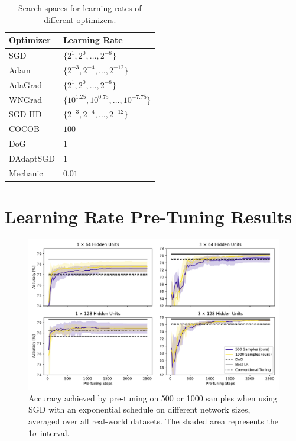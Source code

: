 \documentclass[letterpaper]{article} %
\begin{document}
\begin{table}[H]
	\centering
	\begin{tabular}{ll}
		\toprule
		Optimizer & Learning Rate                                  \\
		\midrule
		SGD       & $\{2^{1}, 2^{0}, \ldots, 2^{-8}\}$             \\
		Adam      & $\{2^{-3}, 2^{-4}, \ldots, 2^{-12}\}$          \\
		AdaGrad   & $\{2^{1}, 2^{0}, \ldots, 2^{-8}\}$             \\
		WNGrad    & $\{10^{1.25}, 10^{0.75}, \ldots, 10^{-7.75}\}$ \\
		SGD-HD    & $\{2^{-3}, 2^{-4}, \ldots, 2^{-12}\}$          \\ \midrule
		COCOB     & $100$                                          \\
		DoG       & $1$                                            \\
		DAdaptSGD & $1$                                            \\
		Mechanic  & $0.01$                                         \\
		\bottomrule
	\end{tabular}
	\caption{Search spaces for learning rates of different optimizers.}
\end{table}

\section{Learning Rate Pre-Tuning Results}\label{app:pretune_model_sizes}

\begin{figure}[h]
	\centering
	\includegraphics[width=.47\textwidth]{figures/pretune_architectures_exp_schedule.pdf}
	\caption{Accuracy achieved by pre-tuning on 500 or 1000 samples when using SGD with an exponential schedule on different network sizes, averaged over all real-world datasets. The shaded area represents the 1$\sigma$-interval.}
\end{figure}
\end{document}
